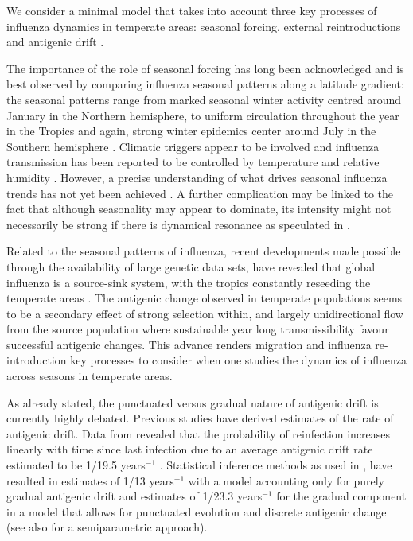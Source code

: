 \documentclass[12pt]{article}
\begin{document}
We consider a minimal model that takes into account three key
processes of influenza dynamics in temperate areas: seasonal forcing,
external reintroductions and antigenic drift \citep{Nelson2007}.

The importance of the role of seasonal forcing has long been
acknowledged and is best observed by comparing influenza seasonal
patterns along a latitude gradient: the seasonal patterns range from
marked seasonal winter activity centred around January in the Northern
hemisphere, to uniform circulation throughout the year in the Tropics
and again, strong winter epidemics center around July in the Southern
hemisphere \citep{Viboud2006}. Climatic triggers appear to be involved
\citep{Alonso2007a} and influenza transmission has been reported to be
controlled by temperature and relative humidity \citep{Lowen2007}.
However, a precise understanding of what drives seasonal influenza
trends has not yet been achieved \citep{Finkelman2007, Lofgren2007}. A
further complication may be linked to the fact that although
seasonality may appear to dominate, its intensity might not
necessarily be strong if there is dynamical resonance as speculated in
\citep{Dushoff2004}.

Related to the seasonal patterns of influenza, recent developments
made possible through the availability of large genetic data sets,
have revealed that global influenza is a source-sink system, with the
tropics constantly reseeding the temperate areas \citep{Rambaut2008,
  Russell2008}. The antigenic change observed in temperate populations
seems to be a secondary effect of strong selection within, and largely
unidirectional flow from the source population where sustainable year
long transmissibility favour successful antigenic changes. This
advance renders migration and influenza re-introduction key processes
to consider when one studies the dynamics of influenza across seasons
in temperate areas.

As already stated, the punctuated versus gradual nature of antigenic
drift is currently highly debated. Previous studies have derived
estimates of the rate of antigenic drift. Data from \citet{Potter1977}
revealed that the probability of reinfection increases linearly with
time since last infection due to an average antigenic drift rate
estimated to be 1/19.5 years$^{-1}$ \citep{Pease1987}. Statistical
inference methods as used in \citet{Finkenstaedt2005}, have resulted
in estimates of 1/13 years$^{-1}$ with a model accounting only for
purely gradual antigenic drift and estimates of 1/23.3 years$^{-1}$
for the gradual component in a model that allows for punctuated
evolution and discrete antigenic change (see also \citet{Xia2005} for
a semiparametric approach).
\end{document}

